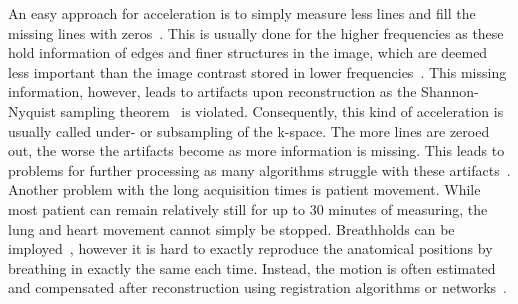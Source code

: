 An easy approach for acceleration is to simply measure less lines and fill the missing lines with zeros~\cite{DeepMRIReconstructionSubsampling}. This is usually done for the higher frequencies as these hold information of edges and finer structures in the image, which are deemed less important than the image contrast stored in lower frequencies~\cite{AdvancesPI}. This missing information, however, leads to artifacts upon reconstruction as the Shannon-Nyquist sampling theorem~\cite{Shannon} is violated. Consequently, this kind of acceleration is usually called under- or subsampling of the k-space. The more lines are zeroed out, the worse the artifacts become as more information is missing. This leads to problems for further processing as many algorithms struggle with these artifacts~\cite{DeepMRIReconstructionSubsampling}. \\
Another problem with the long acquisition times is patient movement. While most patient can remain relatively still for up to 30 minutes of measuring, the lung and heart movement cannot simply be stopped. Breathholds can be imployed~\cite{Zaitsev2015}, however it is hard to exactly reproduce the anatomical positions by breathing in exactly the same each time. Instead, the motion is often estimated and compensated after reconstruction using registration algorithms or networks~\cite{Kuestner2022,Chen2023,GRICS}.

